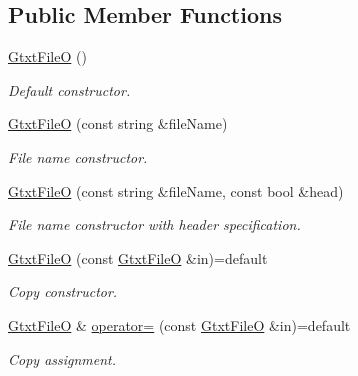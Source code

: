 \subsection*{Public Member Functions}
\begin{DoxyCompactItemize}
\item 
\mbox{\label{classsamp_files_1_1_gtxt_file_o_a3c79c55c24e4c856763746327091f43b}} 
\hyperlink{classsamp_files_1_1_gtxt_file_o_a3c79c55c24e4c856763746327091f43b}{Gtxt\+FileO} ()
\begin{DoxyCompactList}\small\item\em Default constructor. \end{DoxyCompactList}\item 
\hyperlink{classsamp_files_1_1_gtxt_file_o_a3329b261b0364edfdc47842609271eb6}{Gtxt\+FileO} (const string \&file\+Name)
\begin{DoxyCompactList}\small\item\em File name constructor. \end{DoxyCompactList}\item 
\hyperlink{classsamp_files_1_1_gtxt_file_o_a84944d8c2b0e6c6eeb877b53e17fc104}{Gtxt\+FileO} (const string \&file\+Name, const bool \&head)
\begin{DoxyCompactList}\small\item\em File name constructor with header specification. \end{DoxyCompactList}\item 
\mbox{\label{classsamp_files_1_1_gtxt_file_o_a95cba7e971f6c87c09afc4084433c9c2}} 
\hyperlink{classsamp_files_1_1_gtxt_file_o_a95cba7e971f6c87c09afc4084433c9c2}{Gtxt\+FileO} (const \hyperlink{classsamp_files_1_1_gtxt_file_o}{Gtxt\+FileO} \&in)=default
\begin{DoxyCompactList}\small\item\em Copy constructor. \end{DoxyCompactList}\item 
\mbox{\label{classsamp_files_1_1_gtxt_file_o_a071b19053431ba537a6534a4948adc7c}} 
\hyperlink{classsamp_files_1_1_gtxt_file_o}{Gtxt\+FileO} \& \hyperlink{classsamp_files_1_1_gtxt_file_o_a071b19053431ba537a6534a4948adc7c}{operator=} (const \hyperlink{classsamp_files_1_1_gtxt_file_o}{Gtxt\+FileO} \&in)=default
\begin{DoxyCompactList}\small\item\em Copy assignment. \end{DoxyCompactList}\item 

\end{DoxyCompactItemize}
